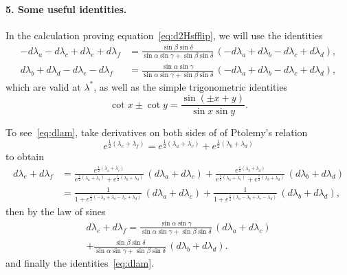\documentclass[a4paper, 11pt]{article}
\theoremstyle{plain}
\theoremstyle{definition}
\begin{document}
\paragraph{5. Some useful identities.} In the calculation proving
equation~\eqref{eq:d2Hsfflip}, we will use the identities
\begin{equation}
  \label{eq:dlam}
  \begin{split}
    -d\lambda_{a}-d\lambda_{c}+d\lambda_{e}+d\lambda_{f} &=
    \frac{\sin\beta\sin\delta}{\sin\alpha\sin\gamma+\sin\beta\sin\delta}\,
    (-d\lambda_{a}+d\lambda_{b}-d\lambda_{c}+d\lambda_{d}),\\
    d\lambda_{b}+d\lambda_{d}-d\lambda_{e}-d\lambda_{f} &=
    \frac{\sin\alpha\sin\gamma}{\sin\alpha\sin\gamma+\sin\beta\sin\delta}\,
    (-d\lambda_{a}+d\lambda_{b}-d\lambda_{c}+d\lambda_{d}),
  \end{split}
\end{equation}
which are valid at $\lambda^{*}$, as well as the simple trigonometric identities
\begin{equation}
  \label{eq:cotidentity}
  \cot x\pm \cot y=\frac{\sin(\pm x+y)}{\sin x\sin y}.
\end{equation}

To see~\eqref{eq:dlam}, take derivatives on both sides
of of Ptolemy's relation
\begin{equation*}
  e^{\frac{1}{2}(\lambda_{e}+\lambda_{f})}
  =e^{\frac{1}{2}(\lambda_{a}+\lambda_{c})}
  +e^{\frac{1}{2}(\lambda_{b}+\lambda_{d})}
\end{equation*}
to obtain
\begin{align*}
  d\lambda_{e}+d\lambda_{f}
  &=\frac{e^{\frac{1}{2}(\lambda_{a}+\lambda_{c})}}{e^{\frac{1}{2}(\lambda_{a}+\lambda_{c})}+e^{\frac{1}{2}(\lambda_{b}+\lambda_{d})}}
    \,(d\lambda_{a}+d\lambda_{c})
    +\frac{e^{\frac{1}{2}(\lambda_{b}+\lambda_{d})}}{e^{\frac{1}{2}(\lambda_{a}+\lambda_{c})}+e^{\frac{1}{2}(\lambda_{b}+\lambda_{d})}}
    \,(d\lambda_{b}+d\lambda_{d})\\
  &=\frac{1}{1+e^{\frac{1}{2}(-\lambda_{a}+\lambda_{b}-\lambda_{c}+\lambda_{d})}}
    \,(d\lambda_{a}+d\lambda_{c})
    +\frac{1}{1+e^{\frac{1}{2}(\lambda_{a}-\lambda_{b}+\lambda_{c}-\lambda_{d})}}
    \,(d\lambda_{b}+d\lambda_{d}), 
\end{align*}
then by the law of sines
\begin{multline}
  \label{eq:dptolemy}
  d\lambda_{e}+d\lambda_{f}
  =\frac{\sin\alpha\sin\gamma}{\sin\alpha\sin\gamma+\sin\beta\sin\delta}
  \,(d\lambda_{a}+d\lambda_{c})\\
  +\frac{\sin\beta\sin\delta}{\sin\alpha\sin\gamma+\sin\beta\sin\delta}
  \,(d\lambda_{b}+d\lambda_{d}).
\end{multline}
and finally the identities~\eqref{eq:dlam}.
\end{document}
